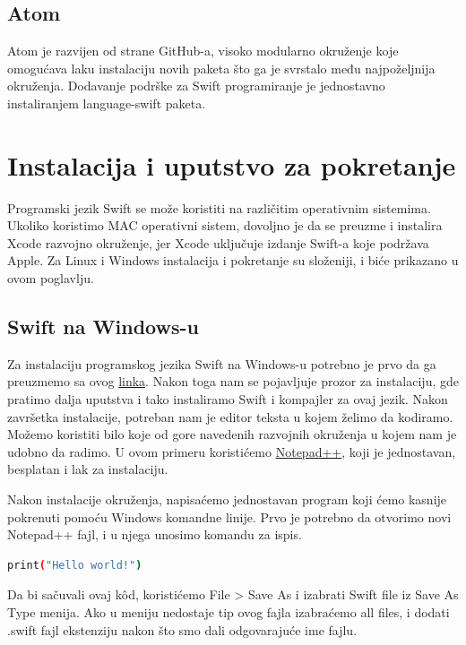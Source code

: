 \documentclass[a4paper]{article}
\begin{document}
\subsection{Atom}
\label{subsec:podnaslovAtom}
Atom je razvijen od strane GitHub-a, visoko modularno okruženje koje omogućava laku instalaciju novih paketa što ga je svrstalo među najpoželjnija okruženja. Dodavanje podrške za Swift programiranje je jednostavno instaliranjem language-swift paketa.

\section{Instalacija i uputstvo za pokretanje}	
\label{sec:sestiDeo}
Programski jezik Swift se može koristiti na različitim operativnim sistemima. Ukoliko koristimo MAC operativni sistem, dovoljno je da se preuzme i instalira Xcode razvojno okruženje, jer Xcode uključuje izdanje Swift-a koje podržava Apple. Za Linux i Windows instalacija i pokretanje su složeniji, i biće prikazano u ovom poglavlju.

\subsection{Swift na Windows-u}
\label{subsec:podnaslovWindows}
Za instalaciju programskog jezika Swift na Windows-u potrebno je prvo da ga preuzmemo sa ovog \href{https://swiftforwindows.github.io}{linka}. Nakon toga nam se pojavljuje prozor za instalaciju, gde pratimo dalja uputstva i tako instaliramo Swift i kompajler za ovaj jezik. Nakon završetka instalacije, potreban nam je editor teksta u kojem želimo da kodiramo. Možemo koristiti bilo koje od gore navedenih razvojnih okruženja u kojem nam je udobno da radimo. U ovom primeru koristićemo \href{https://notepad-plus-plus.org/download/v7.6.4.html}{Notepad++}, koji je jednostavan, besplatan i lak za instalaciju.

Nakon instalacije okruženja, napisaćemo jednostavan program koji ćemo kasnije pokrenuti pomoću Windows komandne linije. Prvo je potrebno da otvorimo novi Notepad++ fajl, i u njega unosimo komandu za ispis.

\begin{lstlisting}[language=bash, caption={Primer komande}]
print("Hello world!")
\end{lstlisting}

Da bi sačuvali ovaj k\^{o}d, koristićemo File > Save As i izabrati Swift file iz Save As Type menija. Ako u meniju nedostaje tip ovog fajla izabraćemo all files, i dodati .swift fajl ekstenziju nakon što smo dali odgovarajuće ime fajlu.
\end{document}
